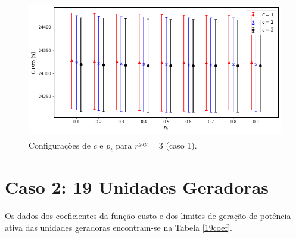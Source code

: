 \documentclass[
	12pt,				%
	openany,			%
	twoside,			%
	a4paper,			%
	chapter=TITLE,		%
	section=Title,		%
	subsection=Title,	%
	subsubsection=Title,%
	english,			%
	french,				%
	spanish,			%
	brazil			%
	]{abntex2}
\begin{document}
\begin{ERRATA}
\begin{apendicesenv}
\begin{figure}[h!]
\end{figure}

\begin{figure}[h!]
    \caption{\label{rgap3_13}Configurações de $c$ e $p_t$ para $r^{gap}=3$ (caso 1).}
    \centering
    \includegraphics[width=120mm, height=60mm]{images/rgap3_13.png}
\end{figure}



\pagebreak
\section{Caso 2: 19 Unidades Geradoras}

Os dados dos coeficientes da função custo e dos limites de geração de potência ativa das unidades geradoras encontram-se na Tabela \ref{19coef}.


\end{apendicesenv}
\end{ERRATA}
\end{document}
